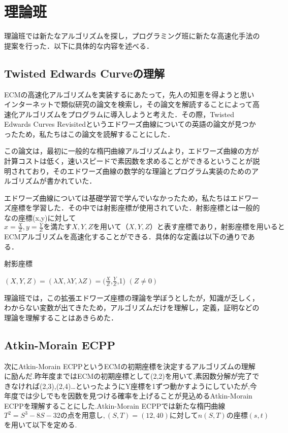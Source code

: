 \documentclass[openany,11pt,papersize]{jsbook}
\begin{document}

\section{理論班}
理論班では新たなアルゴリズムを探し，プログラミング班に新たな高速化手法の提案を行った．以下に具体的な内容を述べる．

\subsection{Twisted Edwards Curveの理解}
ECMの高速化アルゴリズムを実装するにあたって，先人の知恵を得ようと思いインターネットで類似研究の論文を検索し，その論文を解読することによって高速化アルゴリズムをプログラムに導入しようと考えた．その際，Twisted Edwards Curves Revisitedというエドワーズ曲線についての英語の論文が見つかったため，私たちはこの論文を読解することにした．

この論文は，最初に一般的な楕円曲線アルゴリズムより，エドワーズ曲線の方が計算コストは低く，速いスピードで素因数を求めることができるということが説明されており，そのエドワーズ曲線の数学的な理論とプログラム実装のためのアルゴリズムが書かれていた．

エドワーズ曲線については基礎学習で学んでいなかったため，私たちはエドワーズ座標を学習した．その中では射影座標が使用されていた．射影座標とは一般的なの座標(x,y)に対して$x=\frac{X}{Z},y=\frac{Y}{Z}を満たすX,Y,Zを用いて（X,Y,Z）と表す座標であり，射影座標を用いると$ECMアルゴリズムを高速化することができる．具体的な定義は以下の通りである．

\begin{itembox}[l]{射影座標}
\begin{center}
$(X,Y,Z)=(\lambda X, \lambda Y, \lambda Z)=$$(\displaystyle \frac{X}{Z}$,$\displaystyle \frac{Y}{Z}$,1) $(Z\neq0)$
\end{center}
\end{itembox}

理論班では，この拡張エドワーズ座標の理論を学ぼうとしたが，知識が乏しく，わからない変数が出てきたため，アルゴリズムだけを理解し，定義，証明などの理論を理解することはあきらめた．


\subsection{Atkin-Morain ECPP}
\label{sec:ECPP}
次にAtkin-Morain ECPPというECMの初期座標を決定するアルゴリズムの理解に励んだ.昨年度まではECMの初期座標として(2,2)を用いて,素因数分解が完了できなければ(2,3),(2,4)…といったようにY座標を1ずつ動かすようにしていたが,今年度では少しでもを因数を見つける確率を上げることが見込めるAtkin-Morain ECPPを理解することにした.Atkin-Morain ECPPでは新たな楕円曲線$T^2=S^3-8S-32の点を用意し,(S,T)=(12,40)に対してn(S,T)の座標(s,t)$を用いて以下を定める.
\end{document}
